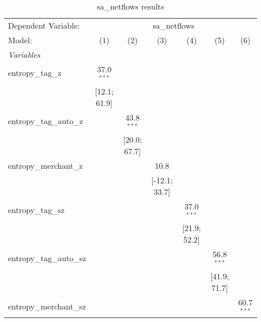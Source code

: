 
\begin{table}[htbp]
   \centering
   \tiny
   \begin{threeparttable}[b]
      \caption{\label{tab:reg_sa_netflows_full_nofe.tex} sa\_netflows results}
      \begin{tabular}{lcccccc}
         \tabularnewline \midrule \midrule
         Dependent Variable: & \multicolumn{6}{c}{sa\_netflows}\\
         Model:                    & (1)              & (2)              & (3)              & (4)              & (5)              & (6)\\  
         \midrule
         \emph{Variables}\\
         entropy\_tag\_z           & 37.0$^{***}$     &                  &                  &                  &                  &   \\   
                                   & [12.1; 61.9]     &                  &                  &                  &                  &   \\   
         entropy\_tag\_auto\_z     &                  & 43.8$^{***}$     &                  &                  &                  &   \\   
                                   &                  & [20.0; 67.7]     &                  &                  &                  &   \\   
         entropy\_merchant\_z      &                  &                  & 10.8             &                  &                  &   \\   
                                   &                  &                  & [-12.1; 33.7]    &                  &                  &   \\   
         entropy\_tag\_sz          &                  &                  &                  & 37.0$^{***}$     &                  &   \\   
                                   &                  &                  &                  & [21.9; 52.2]     &                  &   \\   
         entropy\_tag\_auto\_sz    &                  &                  &                  &                  & 56.8$^{***}$     &   \\   
                                   &                  &                  &                  &                  & [41.9; 71.7]     &   \\   
         entropy\_merchant\_sz     &                  &                  &                  &                  &                  & 60.7$^{***}$\\   

\end{tabular}
\end{threeparttable}
\end{table}
